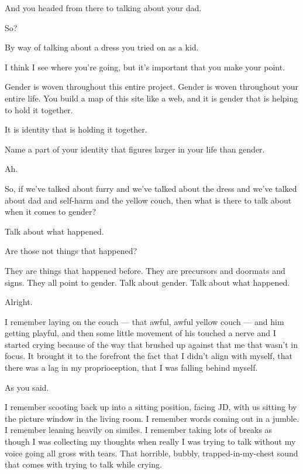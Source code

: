 \begin{paracol}{2}
\begin{leftcolumn}
\begin{ally}
And you headed from there to talking about your dad.
\end{ally}
So?

\begin{ally}
By way of talking about a dress you tried on as a kid.
\end{ally}
I think I see where you're going, but it's important that you make your point.

\begin{ally}
Gender is woven throughout this entire project. Gender is woven throughout your entire life. You build a map of this site like a web, and it is gender that is helping to hold it together.
\end{ally}
It is identity that is holding it together.

\begin{ally}
Name a part of your identity that figures larger in your life than gender.
\end{ally}
Ah.
\newpage

\noindent So, if we've talked about furry and we've talked about the dress and we've talked about dad and self-harm and the yellow couch, then what is there to talk about when it comes to gender?

\begin{ally}
Talk about what happened.
\end{ally}
Are those not things that happened?

\begin{ally}
They are things that happened before. They are precursors and doormats and signs. They all point to gender. Talk about gender. Talk about what happened.
\end{ally}
Alright.

I remember laying on the couch --- that awful, awful yellow couch --- and him getting playful, and then some little movement of his touched a nerve and I started crying because of the way that brushed up against that me that wasn't in focus. It brought it to the forefront the fact that I didn't align with myself, that there was a lag in my proprioception, that I was falling behind myself.

\begin{ally}
As you said.
\end{ally}
I remember scooting back up into a sitting position, facing JD, with us sitting by the picture window in the living room. I remember words coming out in a jumble. I remember leaning heavily on similes. I remember taking lots of breaks as though I was collecting my thoughts when really I was trying to talk without my voice going all gross with tears. That horrible, bubbly, trapped-in-my-chest sound that comes with trying to talk while crying.


\end{leftcolumn}
\end{paracol}
